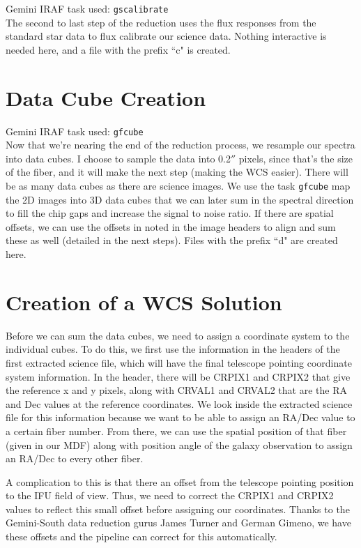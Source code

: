 \documentclass[12pt]{report}
\begin{document}
\noindent Gemini IRAF task used: \texttt{gscalibrate}\\

\noindent The second to last step of the reduction uses the flux responses from the standard star data to flux calibrate our science data. Nothing interactive is needed here, and a file with the prefix ``c" is created.

\section{Data Cube Creation}

\noindent Gemini IRAF task used: \texttt{gfcube}\\

\noindent Now that we're nearing the end of the reduction process, we resample our spectra into data cubes. I choose to sample the data into 0.2$''$ pixels, since that's the size of the fiber, and it will make the next step (making the WCS easier). There will be as many data cubes as there are science images. We use the task \texttt{gfcube} map the 2D images into 3D data cubes that we can later sum in the spectral direction to fill the chip gaps and increase the signal to noise ratio. If there are spatial offsets, we can use the offsets in noted in the image headers to align and sum these as well (detailed in the next steps). Files with the prefix ``d" are created here.

\section{Creation of a WCS Solution}

Before we can sum the data cubes, we need to assign a coordinate system to the individual cubes. To do this, we first use the information in the headers of the first extracted science file, which will have the final telescope pointing coordinate system information. In the header, there will be CRPIX1 and CRPIX2 that give the reference x and y pixels, along with CRVAL1 and CRVAL2 that are the RA and Dec values at the reference coordinates. We look inside the extracted science file for this information because we want to be able to assign an RA/Dec value to a certain fiber number. From there, we can use the spatial position of that fiber (given in our MDF) along with position angle of the galaxy observation to assign an RA/Dec to every other fiber.

A complication to this is that there an offset from the telescope pointing position to the IFU field of view. Thus, we need to correct the CRPIX1 and CRPIX2 values to reflect this small offset before assigning our coordinates. Thanks to the Gemini-South data reduction gurus James Turner and German Gimeno, we have these offsets and the pipeline can correct for this automatically. 
\end{document}
